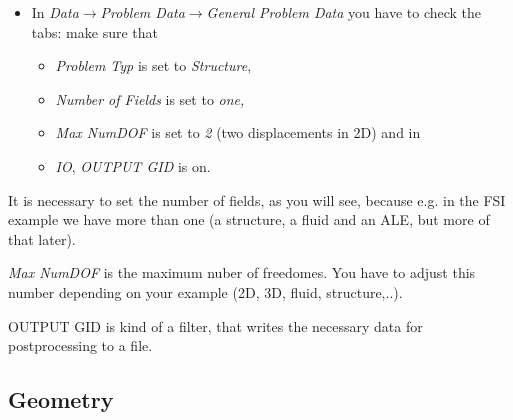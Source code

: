 \begin{itemize}
\item In \emph{Data$\to$Problem Data$\to$General Problem Data} you have
to check the tabs: make sure that 

\begin{itemize}
\item \emph{Problem Typ} is set to \emph{Structure}, 
\item \emph{Number of Fields} is set to \emph{one, }
\item \emph{Max NumDOF} is set to \emph{2} (two displacements in 2D) and
in 
\item \emph{IO}, \emph{OUTPUT GID} is on.
\end{itemize}
\end{itemize}
It is necessary to set the number of fields, as you will see, because
e.g. in the FSI example we have more than one (a structure, a fluid
and an ALE, but more of that later).

\emph{Max NumDOF} is the maximum nuber of freedomes. You have to adjust
this number depending on your example (2D, 3D, fluid, structure,..).

OUTPUT GID is kind of a filter, that writes the necessary data for
postprocessing to a file.


\subsection{Geometry}

